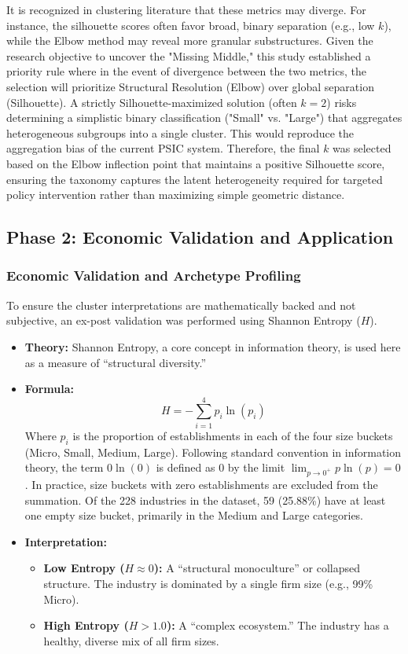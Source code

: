 \documentclass[acmtog, nonacm]{acmart}
\begin{document}
It is recognized in clustering literature that these metrics may diverge. For instance, the silhouette scores often favor broad, binary separation (e.g., low $k$), while the Elbow method may reveal more granular substructures.
Given the research objective to uncover the "Missing Middle," this study established a priority rule where in the event of divergence between the two metrics, the selection will prioritize Structural Resolution (Elbow) over global separation (Silhouette).
A strictly Silhouette-maximized solution (often $k=2$) risks determining a simplistic binary classification ("Small" vs. "Large") that aggregates heterogeneous subgroups into a single cluster. This would reproduce the aggregation bias of the current PSIC system. Therefore, the final $k$ was selected based on the Elbow inflection point that maintains a positive Silhouette score, ensuring the taxonomy captures the latent heterogeneity required for targeted policy intervention rather than maximizing simple geometric distance.

\subsection{Phase 2: Economic Validation and Application}

\subsubsection{Economic Validation and Archetype Profiling}
To ensure the cluster interpretations are mathematically backed and not subjective, an ex-post validation was performed using Shannon Entropy ($H$).

\begin{itemize}
    \item \textbf{Theory:} Shannon Entropy, a core concept in information theory, is used here as a measure of ``structural diversity.''
    \item \textbf{Formula:} 
    \begin{equation}
        H = - \sum_{i=1}^{4} p_i \ln(p_i)
    \end{equation}
    Where $p_i$ is the proportion of establishments in each of the four size buckets (Micro, Small, Medium, Large). Following standard convention in information theory, the term $0 \ln(0)$ is defined as 0 by the limit $\lim_{p \to 0^+} p \ln(p) = 0$. In practice, size buckets with zero establishments are excluded from the summation. Of the 228 industries in the dataset, 59 (25.88\%) have at least one empty size bucket, primarily in the Medium and Large categories.

    \item \textbf{Interpretation:}
    \begin{itemize}
        \item \textbf{Low Entropy ($H \approx 0$):} A ``structural monoculture'' or collapsed structure. The industry is dominated by a single firm size (e.g., 99\% Micro).
        \item \textbf{High Entropy ($H > 1.0$):} A ``complex ecosystem.'' The industry has a healthy, diverse mix of all firm sizes.
    \end{itemize}
\end{itemize}
\end{document}
